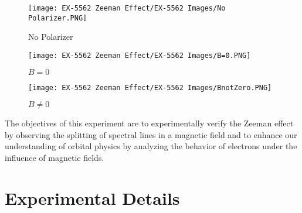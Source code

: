 \documentclass[11pt]{article}
\begin{document}
	\begin{figure}[ht]
		\centering
		\begin{minipage}{0.3\textwidth}
			\texttt{[image: EX-5562 Zeeman Effect/EX-5562 Images/No Polarizer.PNG]}
			\caption{No Polarizer}
		\end{minipage}
		\hfill
		\begin{minipage}{0.3\textwidth}
			\texttt{[image: EX-5562 Zeeman Effect/EX-5562 Images/B=0.PNG]}
			\caption{$B=0$}
		\end{minipage}
		\hfill
		\begin{minipage}{0.3\textwidth}
			\texttt{[image: EX-5562 Zeeman Effect/EX-5562 Images/BnotZero.PNG]}
			\caption{$B\neq0$}
		\end{minipage}
	\end{figure}
	
	The objectives of this experiment are to experimentally verify the Zeeman effect by observing the splitting of spectral lines in a magnetic field and to enhance our understanding of orbital physics by analyzing the behavior of electrons under the influence of magnetic fields.

\clearpage

	\section{Experimental Details}
	
\end{document}
